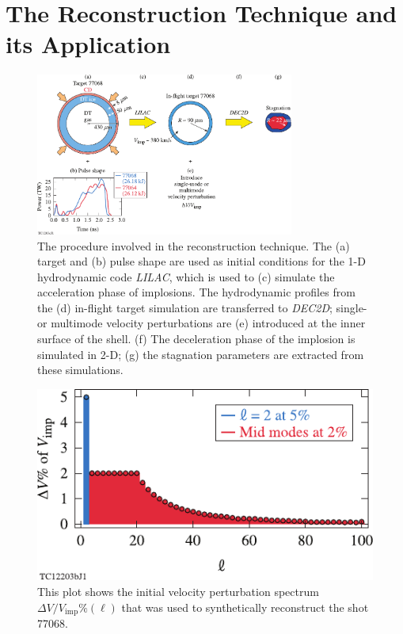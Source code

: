 \documentclass[aip,reprint]{revtex4-1}
\begin{document}
\section{The Reconstruction Technique and its Application}
\label{sec:Exp_technique}
%
%
\begin{figure}
\includegraphics[width=85mm]{Fig3_Bose}
\caption{\label{fig:Exp_technique} The procedure involved in the reconstruction technique. The (a) target and (b) pulse shape are used as initial conditions for the 1-D hydrodynamic code \textit{LILAC}, which is used to (c) simulate the acceleration phase of implosions. The hydrodynamic profiles from the (d) in-flight target simulation are transferred to \textit{DEC2D}; single- or multimode velocity perturbations are (e) introduced at the inner surface of the shell. (f) The deceleration phase of the implosion is simulated in 2-D; (g) the stagnation parameters are extracted from these simulations.}
\end{figure}
%
%
%
%
%
\begin{figure}
\includegraphics{Fig4_Bose}
\caption{\label{fig:Exp_spectrum} This plot shows the initial velocity perturbation spectrum $\Delta V/V_{\text{imp}} \% (\ell)$ that was used to synthetically reconstruct the shot 77068.}
\end{figure}
\end{document}
